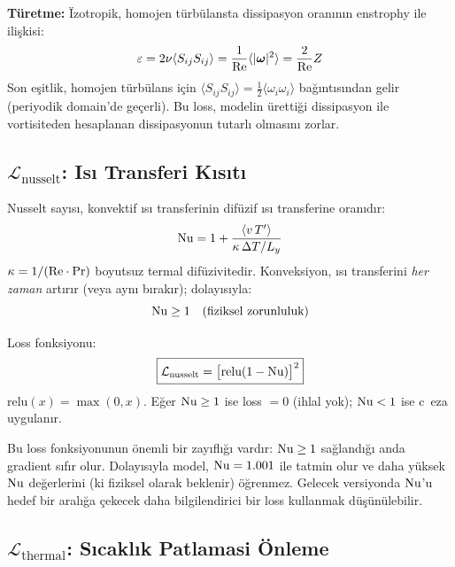 \textbf{Türetme:} \"{I}zotropik, homojen türbülansta dissipasyon oranının enstrophy ile ilişkisi:
\begin{equation}
    \varepsilon = 2\nu \langle S_{ij} S_{ij} \rangle = \frac{1}{\mathrm{Re}}\langle |\bm{\omega}|^2 \rangle = \frac{2}{\mathrm{Re}} Z
    \label{eq:diss_enstrophy}
\end{equation}
Son eşitlik, homojen türbülans için $\langle S_{ij}S_{ij} \rangle = \frac{1}{2}\langle \omega_i \omega_i \rangle$ bağıntısından gelir (periyodik domain'de geçerli). Bu loss, modelin ürettiği dissipasyon ile vortisiteden hesaplanan dissipasyonun tutarlı olmasını zorlar.


\subsection{$\mathcal{L}_{\text{nusselt}}$: Isı Transferi Kısıtı}
\label{sec:loss_nusselt}

Nusselt sayısı, konvektif ısı transferinin difüzif ısı transferine oranıdır:
\begin{equation}
    \mathrm{Nu} = 1 + \frac{\langle v \, T' \rangle}{\kappa \, \Delta T / L_y}
    \label{eq:nusselt_def}
\end{equation}
$\kappa = 1/(\mathrm{Re} \cdot \mathrm{Pr})$ boyutsuz termal difüzivitedir. Konveksiyon, ısı transferini \textit{her zaman} artırır (veya aynı bırakır); dolayısıyla:
\begin{equation}
    \mathrm{Nu} \geq 1 \quad \text{(fiziksel zorunluluk)}
    \label{eq:nu_constraint}
\end{equation}

Loss fonksiyonu:
\begin{equation}
    \boxed{
        \mathcal{L}_{\text{nusselt}} = \big[\text{relu}(1 - \mathrm{Nu})\big]^2
    }
    \label{eq:loss_nusselt}
\end{equation}
$\text{relu}(x) = \max(0, x)$. Eğer $\mathrm{Nu} \geq 1$ ise loss $= 0$ (ihlal yok); $\mathrm{Nu} < 1$ ise c\ eza uygulanır.

\begin{remark}
Bu loss fonksiyonunun önemli bir zayıflığı vardır: $\mathrm{Nu} \geq 1$ sağlandığı anda gradient sıfır olur. Dolayısıyla model, $\mathrm{Nu} = 1.001$ ile tatmin olur ve daha yüksek $\mathrm{Nu}$ değerlerini (ki fiziksel olarak beklenir) öğrenmez. Gelecek versiyonda $\mathrm{Nu}$'u hedef bir aralığa çekecek daha bilgilendirici bir loss kullanmak düşünülebilir.
\end{remark}


\subsection{$\mathcal{L}_{\text{thermal}}$: Sıcaklık Patlamasi Önleme}
\label{sec:loss_thermal}

